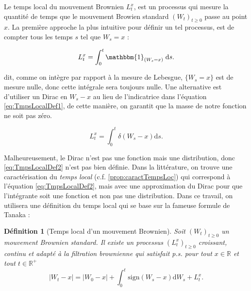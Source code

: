 \documentclass[openany]{book}
\newcommand{\R}{\mathbb{R}}
\newcommand{\1}{\mathbbm{1}}
\newcommand{\sign}{\text{sign}}
\renewcommand{\d}{\mathrm{d}}
\theoremstyle{thmfont}
\theoremstyle{deffont}
\newtheorem{definition}[definition]{Définition}
\theoremstyle{thmfont}
\theoremstyle{deffont}
\begin{document}
Le temps local du mouvement Brownien $L_t^x$, est un processus qui mesure la quantité de temps que le mouvement Browien standard $(W_t)_{t\geq0}$ passe au point $x$.
La première approche la plus intuitive pour définir un tel processus, est de compter tous les temps $s$ tel que $W_s = x$ :

\begin{equation}
  \label{eq:TmpsLocalDef1}
   L^x_t= \int_0^t\1_{(W_s=x)}\;\d s.
  \end{equation}

 dit, comme on intègre par rapport à la mesure de Lebesgue, $\{W_s = x\}$ est de mesure nulle, donc cette intégrale sera toujours nulle. Une alternative est d'utiliser un Dirac en $W_s - x$ au lieu de l'indicatrice dans l'équation \eqref{eq:TmpsLocalDef1}, de cette manière, on garantit que la masse de notre fonction ne soit pas zéro.

\begin{equation}
  \label{eq:TmpsLocalDef2}
  L^x_t= \int_0^t\delta(W_s-x)\d s.
\end{equation}

Malheureusement, le Dirac n'est pas une fonction mais une distribution, donc \eqref{eq:TmpsLocalDef2} n'est pas bien définie. Dans la littérature, on trouve une caractérisation du \textit{temps local} (c.f. \autoref{prop:caractTempsLoc}) qui correspond à l'équation \eqref{eq:TmpsLocalDef2}, mais avec une approximation du Dirac pour que l'intégrante soit une fonction et non pas une distribution. Dans ce travail, on utilisera une définition du temps local qui se base sur la fameuse formule de Tanaka :\\

\begin{definition}[Temps local d'un mouvement Brownien]
  \label{def:TempsLoc}
  Soit $(W_t)_{t\geq0}$ un mouvement Brownien standard. Il existe un processus $(L_t^x)_{t\geq0}$ croissant, continu et adapté à la filtration brownienne qui satisfait p.s. pour tout $x \in \R$ et tout $t \in \R^+$
  \begin{equation}
    |W_t -x|  = |W_0-x| + \int_0^t\sign(W_s - x)\d W_s + L_t^x.
    \label{eq:tempsLocDef}
  \end{equation}
\end{definition}
\end{document}
